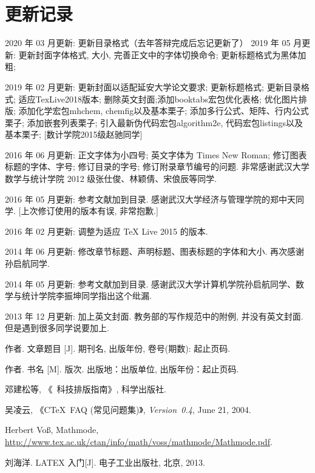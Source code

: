 \documentclass[forprint]{YAUthesis}
\begin{document}
\chapter{更新记录}

2020 年 03 月更新: 更新目录格式（去年答辩完成后忘记更新了）
2019 年 05 月更新: 更新封面字体格式, 大小, 完善正文中的字体切换命令; 更新标题格式为黑体加粗; 

2019 年 02 月更新: 更新封面以适配延安大学论文要求; 更新标题格式; 更新目录格式; 
适应TexLive2018版本; 删除英文封面;添加booktabs宏包优化表格; 优化图片排版; 
添加化学宏包mhchem, chemfig以及基本栗子; 
添加多行公式、矩阵、行内公式栗子; 添加嵌套列表栗子; 
引入最新伪代码宏包algorithm2e, 代码宏包listings以及基本栗子;
[数计学院2015级赵驰同学]

2016 年 06 月更新: 正文字体为小四号; 英文字体为 Times New Roman; 修订图表标题的字体、字号; 修订目录的字号; 修订附录章节编号的问题. 
                          非常感谢武汉大学数学与统计学院 2012 级张仕俊、林颖倩、宋俍辰等同学. 

2016 年 05 月更新: 参考文献加到目录. 感谢武汉大学经济与管理学院的郑中天同学. [上次修订使用的版本有误, 非常抱歉.]

2016 年 02 月更新: 调整为适应 TeX Live 2015 的版本.

2014 年 06 月更新: 修改章节标题、声明标题、图表标题的字体和大小. 再次感谢孙启航同学.

2014 年 05 月更新: 参考文献加到目录. 感谢武汉大学计算机学院孙启航同学、数学与统计学院李振坤同学指出这个纰漏.

2013 年 12 月更新: 加上英文封面. 教务部的写作规范中的附例, 并没有英文封面. 但是遇到很多同学说要加上.





\cleardoublepage{}
{}
\begin{thebibliography}{00}

   作者. 文章题目 [J].  期刊名, 出版年份, 卷号(期数): 起止页码.

   作者. 书名 [M]. 版次. 出版地：出版单位, 出版年份：起止页码.

   邓建松等, 《\LaTeXe~科技排版指南》, 科学出版社.

   吴凌云, 《CTeX~FAQ (常见问题集)》, \textit{Version~0.4}, June 21, 2004.

   Herbert Vo\ss, Mathmode, \url{http://www.tex.ac.uk/ctan/info/math/voss/mathmode/Mathmode.pdf}.
  
   刘海洋. LATEX 入门[J]. 电子工业出版社, 北京, 2013.

\end{thebibliography}
\end{document}
